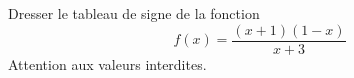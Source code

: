
\begin{exercice}\label{exosmath-0408}

    Dresser le tableau de signe de la fonction
    \begin{equation}
        f(x)=\frac{ (x+1)(1-x) }{ x+3 }
    \end{equation}
    Attention aux valeurs interdites.

\end{exercice}
